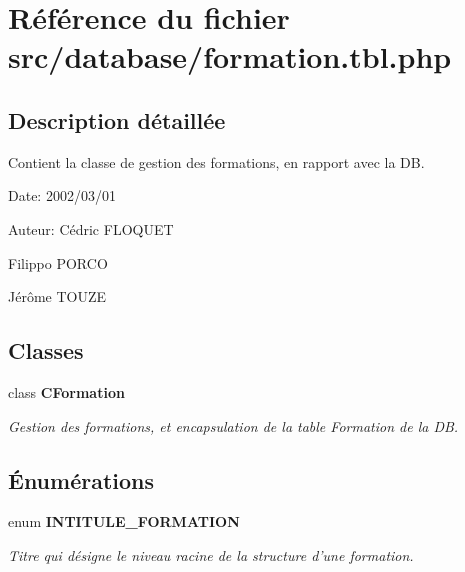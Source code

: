 \section{Référence du fichier src/database/formation.tbl.php}
\label{formation_8tbl_8php}


\subsection{Description détaillée}
Contient la classe de gestion des formations, en rapport avec la DB. 

\begin{Desc}
\item[Date:]2002/03/01\end{Desc}
\begin{Desc}
\item[Auteur:]Cédric FLOQUET 

Filippo PORCO 

Jérôme TOUZE \end{Desc}


\subsection*{Classes}
\begin{CompactItemize}
\item 
class {\bf CFormation}
\begin{CompactList}\small\item\em Gestion des formations, et encapsulation de la table Formation de la DB. \item\end{CompactList}\end{CompactItemize}
\subsection*{Énumérations}
\begin{CompactItemize}
\item 
enum {\bf INTITULE\_\-FORMATION} 
\begin{CompactList}\small\item\em Titre qui désigne le niveau racine de la structure d'une formation. \item\end{CompactList}\end{CompactItemize}
